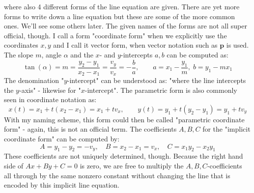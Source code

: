 where also 4 different forms of the line equation are given. There are yet more forms to write down a line equation but these are some of the more common ones. We'll see some others later. The given names of the forms are not all super official, though. I call a form "coordinate form" when we explicitly use the coordinates $x,y$ and I call it vector form, when vector notation such as $\mathbf{p}$ is used. The slope $m$, angle $\alpha$ and the $x$- and $y$-intercepts $a,b$ can be computed as: 
\begin{equation}
 \tan(\alpha) = m = \frac{y_2-y_1}{x_2-x_1} = \frac{v_y}{v_x} = -\frac{b}{a}, \qquad
 a = x_1 - \frac{y_1}{m}, \; b = y_1 - m x_1
\end{equation}
The denomination "$y$-intercept" can be understood as: "where the line intercepts the $y$-axis" - likewise for "$x$-intercept". The parametric form is also commonly seen in coordinate notation as:
\begin{equation}
x(t) = x_1 + t (x_2 - x_1) = x_1 + t v_x, \qquad
y(t) = y_1 + t (y_2 - y_1) = y_1 + t v_y
\end{equation}
With my naming scheme, this form could then be called "parametric coordinate form" - again, this is not an official term. The coefficients $A,B,C$ for the "implicit coordinate form" can be computed by:
\begin{equation}
 A = y_1 - y_2 = -v_y, \quad B = x_2 - x_1 = v_x, \quad C = x_1 y_2 - x_2 y_1
\end{equation}
These coefficients are not uniquely determined, though. Because the right hand side of $Ax + By + C = 0$ is zero, we are free to multiply the $A,B,C$-coefficients all through by the same nonzero constant without changing the line that is encoded by this implicit line equation. 

